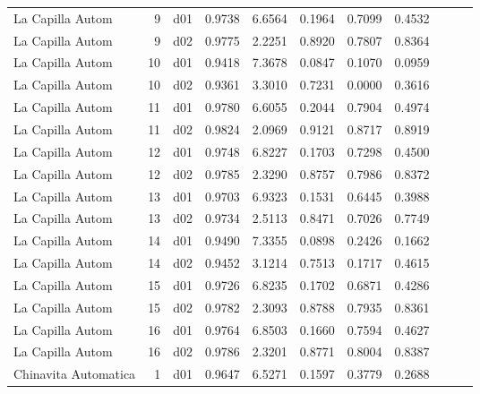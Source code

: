 \begin{landscape}
\begin{longtable}{p{2cm}rrrrrrrrrr}
     La Capilla Autom  &          9 &     d01 &   0.9738 &  6.6564 &        0.1964 &           0.7099 &  0.4532 \\
     La Capilla Autom  &          9 &     d02 &   0.9775 &  2.2251 &        0.8920 &           0.7807 &  0.8364 \\
     La Capilla Autom  &         10 &     d01 &   0.9418 &  7.3678 &        0.0847 &           0.1070 &  0.0959 \\
     La Capilla Autom  &         10 &     d02 &   0.9361 &  3.3010 &        0.7231 &           0.0000 &  0.3616 \\
     La Capilla Autom  &         11 &     d01 &   0.9780 &  6.6055 &        0.2044 &           0.7904 &  0.4974 \\
     La Capilla Autom  &         11 &     d02 &   0.9824 &  2.0969 &        0.9121 &           0.8717 &  0.8919 \\
     La Capilla Autom  &         12 &     d01 &   0.9748 &  6.8227 &        0.1703 &           0.7298 &  0.4500 \\
     La Capilla Autom  &         12 &     d02 &   0.9785 &  2.3290 &        0.8757 &           0.7986 &  0.8372 \\
     La Capilla Autom  &         13 &     d01 &   0.9703 &  6.9323 &        0.1531 &           0.6445 &  0.3988 \\
     La Capilla Autom  &         13 &     d02 &   0.9734 &  2.5113 &        0.8471 &           0.7026 &  0.7749 \\
     La Capilla Autom  &         14 &     d01 &   0.9490 &  7.3355 &        0.0898 &           0.2426 &  0.1662 \\
     La Capilla Autom  &         14 &     d02 &   0.9452 &  3.1214 &        0.7513 &           0.1717 &  0.4615 \\
     La Capilla Autom  &         15 &     d01 &   0.9726 &  6.8235 &        0.1702 &           0.6871 &  0.4286 \\
     La Capilla Autom  &         15 &     d02 &   0.9782 &  2.3093 &        0.8788 &           0.7935 &  0.8361 \\
     La Capilla Autom  &         16 &     d01 &   0.9764 &  6.8503 &        0.1660 &           0.7594 &  0.4627 \\
     La Capilla Autom  &         16 &     d02 &   0.9786 &  2.3201 &        0.8771 &           0.8004 &  0.8387 \\
 Chinavita Automatica  &          1 &     d01 &   0.9647 &  6.5271 &        0.1597 &           0.3779 &  0.2688 \\

\end{longtable}
\end{landscape}
